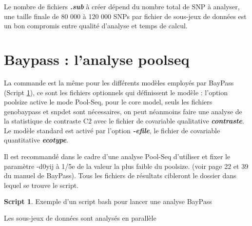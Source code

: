 \documentclass[
  openany]{book}
\theoremstyle{definition}
\theoremstyle{definition}
\newtheorem{example}{Script}[chapter]
\theoremstyle{definition}
\theoremstyle{definition}
\theoremstyle{remark}
\begin{document}
Le nombre de fichiers \textbf{\emph{.sub}} à créer dépend du nombre total de SNP à analyser, une taille finale de 80 000 à 120 000 SNPs par fichier de sous-jeux de données est un bon compromis entre qualité d'analyse et temps de calcul.

\hypertarget{baypass-lanalyse-poolseq}{%
\chapter*{Baypass : l'analyse poolseq}\label{baypass-lanalyse-poolseq}}

La commande est la même pour les différents modèles employés par BayPass (Script \ref{exm:script4}), ce sont les fichiers optionnels qui définissent le modèle :
l'option poolsize active le mode Pool-Seq, pour le core model, seuls les fichiers genobaypass et snpdet sont nécessaires, on peut néanmoins faire une analyse de la statistique de contraste C2 avec le fichier de covariable qualitative \textbf{\emph{contraste}}.
Le modèle standard est activé par l'option \textbf{\emph{-efile}}, le fichier de covariable quantitative \textbf{\emph{ecotype}}.

Il est recommandé dans le cadre d'une analyse Pool-Seq d'utiliser et fixer le paramètre -d0yij à 1/5e de la valeur la plus faible du poolsize. (voir page 22 et 39 du manuel de BayPass).
Tous les fichiers de résultats cibleront le dossier dans lequel se trouve le script.

\begin{example}
\protect\hypertarget{exm:script4}{}\label{exm:script4}{Exemple d'un script bash pour lancer une analyse BayPass}
\end{example}

Les sous-jeux de données sont analysés en parallèle
\end{document}
